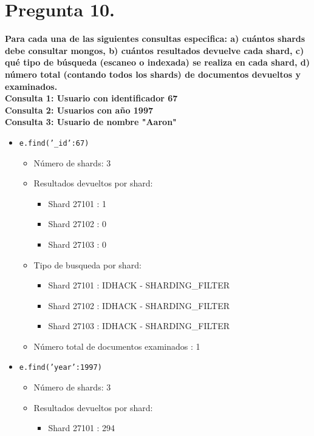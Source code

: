 \documentclass{article}
\begin{document}
  \section{Pregunta 10.}
  \textbf{Para cada una de las siguientes consultas especifica: a)
cuántos shards debe consultar mongos, b) cuántos resultados devuelve cada
shard, c) qué tipo de búsqueda (escaneo o indexada) se realiza en cada
shard, d) número total (contando todos los shards) de documentos devueltos
y examinados.\\
Consulta 1: Usuario con identificador 67\\
Consulta 2: Usuarios con año 1997\\
Consulta 3: Usuario de nombre "Aaron"\\}
    \begin{itemize}
      \item \texttt{e.find({'\_id':67})}
        \begin{itemize}
          \item Número de shards: 3
          \item Resultados devueltos por shard:
            \begin{itemize}
              \item Shard 27101 : 1
              \item Shard 27102 : 0
              \item Shard 27103 : 0
            \end{itemize}
          \item Tipo de busqueda por shard:
            \begin{itemize}
              \item Shard 27101 : IDHACK - SHARDING\_FILTER
              \item Shard 27102 : IDHACK - SHARDING\_FILTER
              \item Shard 27103 : IDHACK - SHARDING\_FILTER
            \end{itemize}
          \item Número total de documentos examinados : 1
        \end{itemize}
      \item \texttt{e.find({'year':1997})}
        \begin{itemize}
          \item Número de shards: 3
          \item Resultados devueltos por shard:
            \begin{itemize}
              \item Shard 27101 : 294

\end{itemize}
\end{itemize}
\end{itemize}
\end{document}
